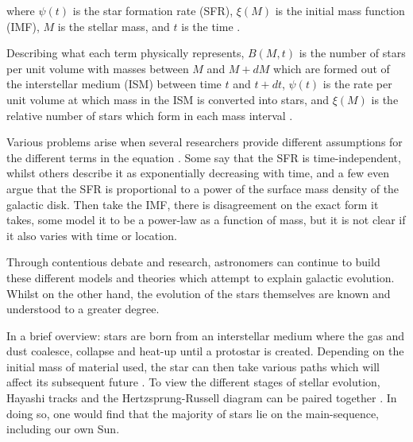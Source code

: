 \documentclass[12pt, twocolumn]{revtex4}    %
\begin{document}
where $\psi(t)$ is the star formation rate (SFR), $\xi (M)$ is the initial mass function (IMF), $M$ is the stellar mass, and $t$ is the time \citep{carroll_astro}. 

Describing what each term physically represents, $B(M,t)$ is the number of stars per unit volume with masses between $M$ and $M+dM$ which are formed out of the interstellar medium (ISM) between time $t$ and $t+dt$, $\psi(t)$ is the rate per unit volume at which mass in the ISM is converted into stars, and $\xi(M)$ is the relative number of stars which form in each mass interval \citep{carroll_astro}. 

Various problems arise when several researchers provide different assumptions for the different terms in the equation \citep{carroll_astro}. Some say that the SFR is time-independent, whilst others describe it as exponentially decreasing with time, and a few even argue that the SFR is proportional to a power of the surface mass density of the galactic disk. Then take the IMF, there is disagreement on the exact form it takes, some model it to be a power-law as a function of mass, but it is not clear if it also varies with time or location.

Through contentious debate and research, astronomers can continue to build these different models and theories which attempt to explain galactic evolution. Whilst on the other hand, the evolution of the stars themselves are known and understood to a greater degree. 

In a brief overview: stars are born from an interstellar medium where the gas and dust coalesce, collapse and heat-up until a protostar is created. Depending on the initial mass of material used, the star can then take various paths which will affect its subsequent future \citep{mccoy_space_sciences}. To view the different stages of stellar evolution, Hayashi tracks and the Hertzsprung-Russell diagram can be paired together \citep{carroll_astro}. In doing so, one would find that the majority of stars lie on the main-sequence, including our own Sun. 
\end{document}
